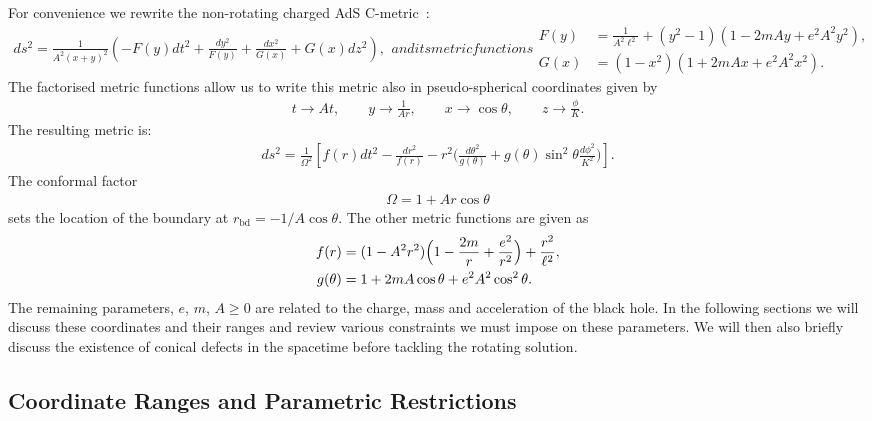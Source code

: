 \documentclass[
twoside,
openright,
frontopenright
]{dmathesis}
\newcommand{\nn}{\nonumber}
\newcommand{\bd}{\mathrm{bd}}
\begin{document}
For convenience we rewrite the non-rotating charged AdS
C-metric~\cite{Hong:2003gx,Hong:2004dm}:
\begin{subequations}
  \label{eq:NRyx}
  \begin{align}
    \label{eq:NRyx-metric}
    ds^2 = \frac{1}{A^2(x+y)^2} \left(-F(y)dt^2 + \frac{dy^2}{F(y)} +
    \frac{dx^2}{G(x)} + G(x) dz^2\right),
  \end{align}
  and its metric functions
  \begin{align}
    \label{eq:NRyx-fn}
    F(y)&=\frac{1}{A^2 \ell^2} + (y^2 - 1)(1-2mAy+e^2A^2y^2),\nn\\
    G(x)&=(1-x^2)(1+2mAx+e^2A^2x^2).
  \end{align}
\end{subequations}
The factorised metric functions allow us to write this metric also in
pseudo-spherical coordinates given by
\begin{gather}
  t \to At, \qquad y \to \frac{1}{Ar}, \qquad x \to \cos\theta, \qquad z \to
  \frac{\phi}{K}.
\end{gather}
The resulting metric is:
\begin{align}
\label{eq:NRrth-metric}
ds^2=\frac{1}{\Omega^2}\left[ 
f(r) dt^2
-\frac{dr^2}{f(r)} - r^2 \Big( \frac{d\theta^2}{g(\theta)} 
+ g(\theta)\sin^2\theta \frac{d\phi^2}{K^2}\Big)\right].
\end{align}
The conformal factor
\begin{align}\label{eq:conf}
\Omega=1+Ar\cos\theta
\end{align}
sets the location of the boundary at $r_\bd=-1/A\cos\theta$. The other metric
functions are given as
\begin{align}
f(r)&=(1-A^2r^2)\Bigl(1-\frac{2 m}{r}+\frac{e^2}{r^2}\Bigr)
+\frac{r^2}{\ell^2},\nn\\
g(\theta)&=1+2mA \cos\theta+ e^2A^2 \cos^2\theta.
\label{eq:NRrth-metric}
\end{align}
The remaining parameters, $e$, $m$, $A\geqslant 0$ are related to the charge,
mass and acceleration of the black hole. In the following sections we will
discuss these coordinates and their ranges and review various constraints we
must impose on these parameters. We will then also briefly discuss the existence
of conical defects in the spacetime before tackling the rotating solution.

\subsection{Coordinate Ranges and Parametric Restrictions}
\label{sec:parameters}
\end{document}
